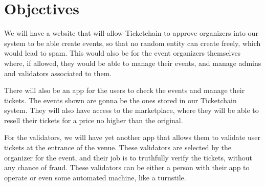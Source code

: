 \section{Objectives}
\label{sec:objectives}

We will have a website that will allow Ticketchain to approve organizers into
our system to be able create events, so that no random entity can create
freely, which would lead to spam. This would also be for the event organizers
themselves where, if allowed, they would be able to manage their events, and
manage admins and validators associated to them.

There will also be an app for the users to check the events and manage their
tickets. The events shown are gonna be the ones stored in our Ticketchain
system. They will also have access to the marketplace, where they will be able
to resell their tickets for a price no higher than the original.

For the validators, we will have yet another app that allows them to validate
user tickets at the entrance of the venue. These validators are selected by the
organizer for the event, and their job is to truthfully verify the tickets,
without any chance of fraud. These validators can be either a person with their
app to operate or even some automated machine, like a turnstile.
